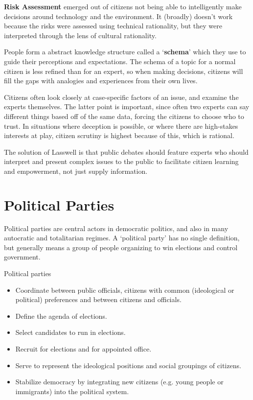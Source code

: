 \textbf{Risk Assessment} emerged out of citizens not being able to
intelligently make decisions around technology and the environment. It
(broadly) doesn't work because the risks were assessed using technical
rationality, but they were interpreted through the lens of cultural
rationality.

People form a abstract knowledge structure called a `\textbf{schema}'
which they use to guide their perceptions and expectations. The schema
of a topic for a normal citizen is less refined than for an expert, so
when making decisions, citizens will fill the gaps with analogies and
experiences from their own lives.

Citizens often look closely at case-specific factors of an issue, and
examine the experts themselves. The latter point is important, since
often two experts can say different things based off of the same data,
forcing the citizens to choose who to trust. In situations where
deception is possible, or where there are high-stakes interests at
play, citizen scrutiny is highest because of this, which is rational.

The solution of Lasswell is that public debates should feature experts
who should interpret and present complex issues to the public to
facilitate citizen learning and empowerment, not just supply
information.

\section{Political Parties}

Political parties are central actors in democratic politics, and also
in many autocratic and totalitarian regimes. A `political party' has
no single definition, but generally means a group of people organizing
to win elections and control government.

Political parties
\begin{itemize}
  \item Coordinate between public officials, citizens with common
    (ideological or political) preferences and between citizens and
    officials.
  \item Define the agenda of elections.
  \item Select candidates to run in elections.
  \item Recruit for elections and for appointed office.
  \item Serve to represent the ideological positions and social
    groupings of citizens.
  \item Stabilize democracy by integrating new citizens (e.g. young
    people or immigrants) into the political system.
\end{itemize}

